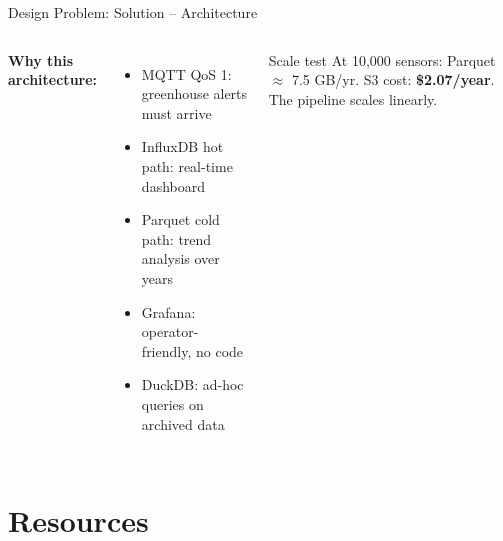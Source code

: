 \documentclass[aspectratio=169,11pt]{beamer}
\begin{document}
\begin{frame}{Design Problem: Solution -- Architecture}
\begin{columns}
        \textbf{Why this architecture:}
        \begin{itemize}
            \item MQTT QoS 1: greenhouse alerts must arrive
            \item InfluxDB hot path: real-time dashboard
            \item Parquet cold path: trend analysis over years
            \item Grafana: operator-friendly, no code
            \item DuckDB: ad-hoc queries on archived data
        \end{itemize}

        \vspace{0.1cm}
        \begin{exampleblock}{Scale test}
            At 10,000 sensors: Parquet $\approx$ 7.5 GB/yr. S3 cost: \textbf{\$2.07/year}. The pipeline scales linearly.
        \end{exampleblock}
    \end{columns}
\end{frame}

\section{Resources}
\end{document}

